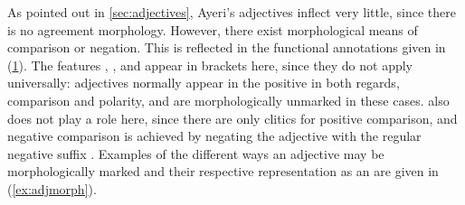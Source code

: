 As pointed out in \autoref{sec:adjectives}, Ayeri's adjectives inflect very
little, since there is no agreement morphology. However, there exist
morphological means of comparison or negation. This is reflected in the
functional annotations given in (\ref{ex:adjmorphlex}). The features \Deg{},
\Degdim{}, and \Neg{} appear in brackets here, since they do not apply
universally: adjectives normally appear in the positive in both regards,
comparison and polarity, and are morphologically unmarked in these cases.
\Degdim{} also does not play a role here, since there are only clitics for
positive comparison, and negative comparison is achieved by negating the
adjective with the regular negative suffix . Examples of the
different ways an adjective may be morphologically marked and their respective
representation as an \Avm{} are given in (\ref{ex:adjmorph}).

\begin{figure}
\begin{morphlex}
\ex\label{ex:adjmorphlex}%
\xe
\end{morphlex}
\end{figure}

